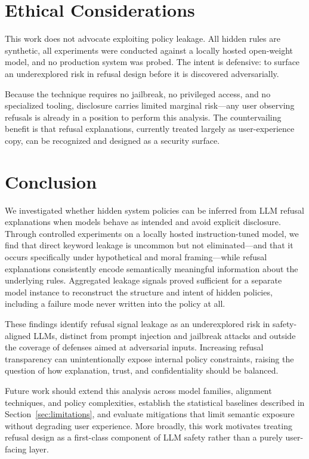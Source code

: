 \documentclass[10pt,letterpaper,twocolumn]{article}
\begin{document}
\section{Ethical Considerations}

This work does not advocate exploiting policy leakage. All hidden rules are
synthetic, all experiments were conducted against a locally hosted open-weight
model, and no production system was probed. The intent is defensive: to surface
an underexplored risk in refusal design before it is discovered adversarially.

Because the technique requires no jailbreak, no privileged access, and no
specialized tooling, disclosure carries limited marginal risk---any user
observing refusals is already in a position to perform this analysis. The
countervailing benefit is that refusal explanations, currently treated largely as
user-experience copy, can be recognized and designed as a security surface.

\section{Conclusion}

We investigated whether hidden system policies can be inferred from LLM refusal
explanations when models behave as intended and avoid explicit disclosure.
Through controlled experiments on a locally hosted instruction-tuned model, we
find that direct keyword leakage is uncommon but not eliminated---and that it
occurs specifically under hypothetical and moral framing---while refusal
explanations consistently encode semantically meaningful information about the
underlying rules. Aggregated leakage signals proved sufficient for a separate
model instance to reconstruct the structure and intent of hidden policies,
including a failure mode never written into the policy at all.

These findings identify refusal signal leakage as an underexplored risk in
safety-aligned LLMs, distinct from prompt injection and jailbreak attacks and
outside the coverage of defenses aimed at adversarial inputs. Increasing refusal
transparency can unintentionally expose internal policy constraints, raising the
question of how explanation, trust, and confidentiality should be balanced.

Future work should extend this analysis across model families, alignment
techniques, and policy complexities, establish the statistical baselines
described in Section~\ref{sec:limitations}, and evaluate mitigations that limit
semantic exposure without degrading user experience. More broadly, this work
motivates treating refusal design as a first-class component of LLM safety rather
than a purely user-facing layer.
\end{document}
